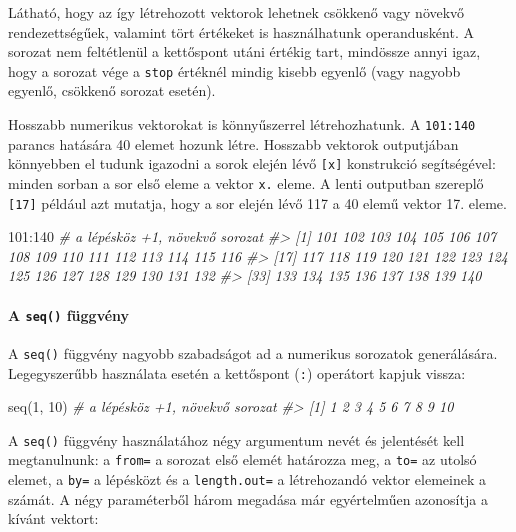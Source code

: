 \documentclass[
]{book}
\newenvironment{Shaded}{\begin{snugshade}}{\end{snugshade}}
\newcommand{\CommentTok}[1]{\textcolor[rgb]{0.56,0.35,0.01}{\textit{#1}}}
\newcommand{\DecValTok}[1]{\textcolor[rgb]{0.00,0.00,0.81}{#1}}
\newcommand{\FunctionTok}[1]{\textcolor[rgb]{0.00,0.00,0.00}{#1}}
\newcommand{\NormalTok}[1]{#1}
\newcommand{\SpecialCharTok}[1]{\textcolor[rgb]{0.00,0.00,0.00}{#1}}
\begin{document}
Látható, hogy az így létrehozott vektorok lehetnek csökkenő vagy növekvő rendezettségűek, valamint tört értékeket is használhatunk operandusként. A sorozat nem feltétlenül a kettőspont utáni értékig tart, mindössze annyi igaz, hogy a sorozat vége a \texttt{stop} értéknél mindig kisebb egyenlő (vagy nagyobb egyenlő, csökkenő sorozat esetén).

Hosszabb numerikus vektorokat is könnyűszerrel létrehozhatunk. A \texttt{101:140} parancs hatására 40 elemet hozunk létre. Hosszabb vektorok outputjában könnyebben el tudunk igazodni a sorok elején lévő \texttt{{[}x{]}} konstrukció segítségével: minden sorban a sor első eleme a vektor \texttt{x.} eleme. A lenti outputban szereplő \texttt{{[}17{]}} például azt mutatja, hogy a sor elején lévő 117 a 40 elemű vektor 17. eleme.

\begin{Shaded}
\begin{Highlighting}[]
\DecValTok{101}\SpecialCharTok{:}\DecValTok{140}  \CommentTok{\# a lépésköz +1, növekvő sorozat}
\CommentTok{\#\textgreater{}  [1] 101 102 103 104 105 106 107 108 109 110 111 112 113 114 115 116}
\CommentTok{\#\textgreater{} [17] 117 118 119 120 121 122 123 124 125 126 127 128 129 130 131 132}
\CommentTok{\#\textgreater{} [33] 133 134 135 136 137 138 139 140}
\end{Highlighting}
\end{Shaded}

\hypertarget{a-seq-fuxfcggvuxe9ny}{%
\paragraph{\texorpdfstring{A \texttt{seq()} függvény}{A seq() függvény}}\label{a-seq-fuxfcggvuxe9ny}}

A \texttt{seq()} függvény nagyobb szabadságot ad a numerikus sorozatok generálására. Legegyszerűbb használata esetén a kettőspont (\texttt{:}) operátort kapjuk vissza:

\begin{Shaded}
\begin{Highlighting}[]
\FunctionTok{seq}\NormalTok{(}\DecValTok{1}\NormalTok{, }\DecValTok{10}\NormalTok{) }\CommentTok{\# a lépésköz +1, növekvő sorozat}
\CommentTok{\#\textgreater{}  [1]  1  2  3  4  5  6  7  8  9 10}
\end{Highlighting}
\end{Shaded}

A \texttt{seq()} függvény használatához négy argumentum nevét és jelentését kell megtanulnunk: a \texttt{from=} a sorozat első elemét határozza meg, a \texttt{to=} az utolsó elemet, a \texttt{by=} a lépésközt és a \texttt{length.out=} a létrehozandó vektor elemeinek a számát. A négy paraméterből három megadása már egyértelműen azonosítja a kívánt vektort:
\end{document}
